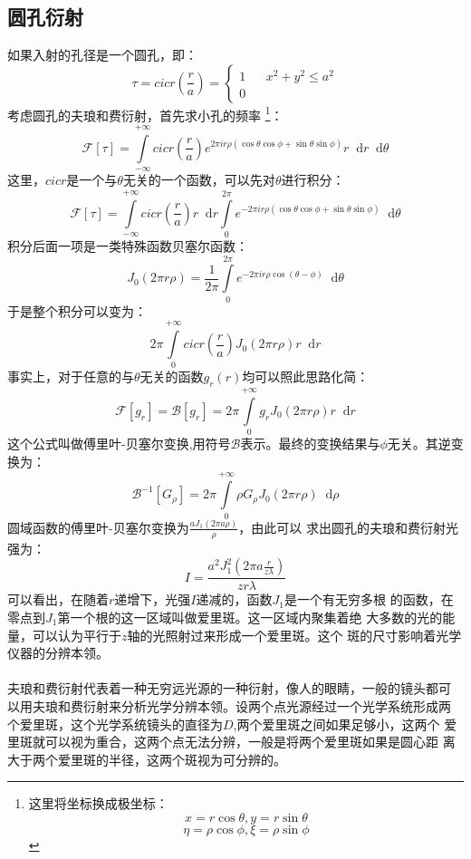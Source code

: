 \documentclass{article}
\newcommand*{\dif}{\mathop{}\!\mathrm{d}}
\begin{document}
\subsection{圆孔衍射}
如果入射的孔径是一个圆孔，即：
\[
  \tau=cicr(\frac{r}{a})=\left \{
    \begin{array}{rcl}
      1&&x^2+y^2\leq a^2\\
      0&&{}
    \end{array}
  \right
  .
\]
考虑圆孔的夫琅和费衍射，首先求小孔的频率
\footnote{
  这里将坐标换成极坐标：
  \[x=r\cos{\theta},y=r\sin{\theta}\]
  \[\eta=\rho\cos{\phi},\xi=\rho\sin{\phi}\]}：
\[\mathscr{F}[\tau]=\int\limits_{-\infty}^{+\infty}cicr(\frac{r}{a})e^{2\pi
    ir\rho(\cos{\theta}\cos{\phi}+\sin{\theta}\sin{\phi})}r\dif
  r\dif\theta\]
这里，$cicr$是一个与$\theta$无关的一个函数，可以先对$\theta$进行积分：
\[\mathscr{F}[\tau]=\int\limits_{-\infty}^{+\infty}cicr(\frac{r}{a})r\dif
  r \int\limits_{0}^{2\pi}e^{-2\pi i
    r\rho(\cos{\theta}\cos{\phi}+\sin{\theta}\sin{\phi})}\dif\theta\]
积分后面一项是一类特殊函数贝塞尔函数：
\[J_0(2\pi r\rho)=\frac{1}{2\pi}\int\limits_{0}^{2\pi}e^{-2\pi i
    r\rho\cos(\theta-\phi)}\dif \theta\]
于是整个积分可以变为：
\[2\pi\int\limits_{0}^{+\infty} cicr(\frac{r}{a})J_0(2\pi
  r\rho)r\dif r\]
事实上，对于任意的与$\theta$无关的函数$g_r(r)$均可以照此思路化简：
\begin{equation}
  \label{eq:8}
  \mathscr{F}[g_r]=\mathscr{B}[g_r]=2\pi\int\limits_{0}^{+\infty}g_rJ_0(2\pi
  r\rho)r\dif r
\end{equation}
这个公式叫做傅里叶-贝塞尔变换,用符号$\mathscr{B}$表示。最终的变换结果与$\phi$无关。其逆变换为：
\begin{equation}
  \label{eq:9}
  \mathscr{B}^{-1}[G_\rho]=2\pi \int\limits_0^{+\infty}\rho
  G_{\rho}J_0(2\pi r\rho)\dif \rho
\end{equation}
圆域函数的傅里叶-贝塞尔变换为$\frac{aJ_1(2\pi a\rho)}{\rho}$，由此可以
求出圆孔的夫琅和费衍射光强为：
\[I=\frac{a^2J_1^2(2\pi a \frac{r}{z\lambda})}{zr\lambda}\]
可以看出，在随着$r$递增下，光强$I$递减的，函数$J_1$是一个有无穷多根
的函数，在零点到$J_1$第一个根的这一区域叫做爱里斑。这一区域内聚集着绝
大多数的光的能量，可以认为平行于$z$轴的光照射过来形成一个爱里斑。这个
斑的尺寸影响着光学仪器的分辨本领。
\paragraph{}
夫琅和费衍射代表着一种无穷远光源的一种衍射，像人的眼睛，一般的镜头都可
以用夫琅和费衍射来分析光学分辨本领。设两个点光源经过一个光学系统形成两
个爱里斑，这个光学系统镜头的直径为$D$,两个爱里斑之间如果足够小，这两个
爱里斑就可以视为重合，这两个点无法分辨，一般是将两个爱里斑如果是圆心距
离大于两个爱里斑的半径，这两个斑视为可分辨的。
\end{document}
